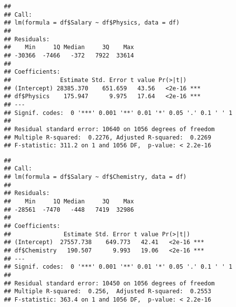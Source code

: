 \documentclass[
]{article}
\newenvironment{Shaded}{\begin{snugshade}}{\end{snugshade}}
\newcommand{\AttributeTok}[1]{\textcolor[rgb]{0.77,0.63,0.00}{#1}}
\newcommand{\FunctionTok}[1]{\textcolor[rgb]{0.00,0.00,0.00}{#1}}
\newcommand{\NormalTok}[1]{#1}
\newcommand{\SpecialCharTok}[1]{\textcolor[rgb]{0.00,0.00,0.00}{#1}}
\begin{document}
\begin{Shaded}
\end{Shaded}

\begin{verbatim}
## 
## Call:
## lm(formula = df$Salary ~ df$Physics, data = df)
## 
## Residuals:
##    Min     1Q Median     3Q    Max 
## -30366  -7466   -372   7922  33614 
## 
## Coefficients:
##              Estimate Std. Error t value Pr(>|t|)    
## (Intercept) 28385.370    651.659   43.56   <2e-16 ***
## df$Physics    175.947      9.975   17.64   <2e-16 ***
## ---
## Signif. codes:  0 '***' 0.001 '**' 0.01 '*' 0.05 '.' 0.1 ' ' 1
## 
## Residual standard error: 10640 on 1056 degrees of freedom
## Multiple R-squared:  0.2276, Adjusted R-squared:  0.2269 
## F-statistic: 311.2 on 1 and 1056 DF,  p-value: < 2.2e-16
\end{verbatim}

\begin{Shaded}
\end{Shaded}

\begin{verbatim}
## 
## Call:
## lm(formula = df$Salary ~ df$Chemistry, data = df)
## 
## Residuals:
##    Min     1Q Median     3Q    Max 
## -28561  -7470   -448   7419  32986 
## 
## Coefficients:
##               Estimate Std. Error t value Pr(>|t|)    
## (Intercept)  27557.738    649.773   42.41   <2e-16 ***
## df$Chemistry   190.507      9.993   19.06   <2e-16 ***
## ---
## Signif. codes:  0 '***' 0.001 '**' 0.01 '*' 0.05 '.' 0.1 ' ' 1
## 
## Residual standard error: 10450 on 1056 degrees of freedom
## Multiple R-squared:  0.256,  Adjusted R-squared:  0.2553 
## F-statistic: 363.4 on 1 and 1056 DF,  p-value: < 2.2e-16
\end{verbatim}
\end{document}
